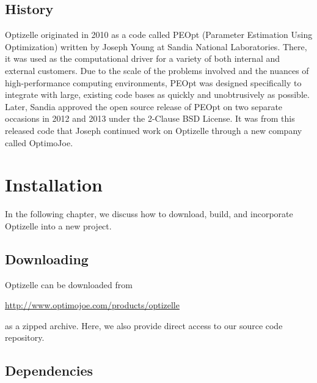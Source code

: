 \documentclass{report}
\begin{document}
\section{History}

        Optizelle originated in 2010 as a code called PEOpt (Parameter Estimation Using Optimization) written by Joseph Young at Sandia National Laboratories.  There, it was used as the computational driver for a variety of both internal and external customers.  Due to the scale of the problems involved and the nuances of high-performance computing environments, PEOpt was designed specifically to integrate with large, existing code bases as quickly and unobtrusively as possible.  Later, Sandia approved the open source release of PEOpt on two separate occasions in 2012 and 2013 under the 2-Clause BSD License.  It was from this released code that Joseph continued work on Optizelle through a new company called OptimoJoe.
        
\chapter{Installation}\label{ch:Install}

        In the following chapter, we discuss how to download, build, and incorporate Optizelle into a new project.

\section{Downloading}

        Optizelle can be downloaded from
\begin{center}
    \mbox{\url{http://www.optimojoe.com/products/optizelle}}
\end{center}
as a zipped archive.  Here, we also provide direct access to our source code repository.

\section{Dependencies}
\end{document}
